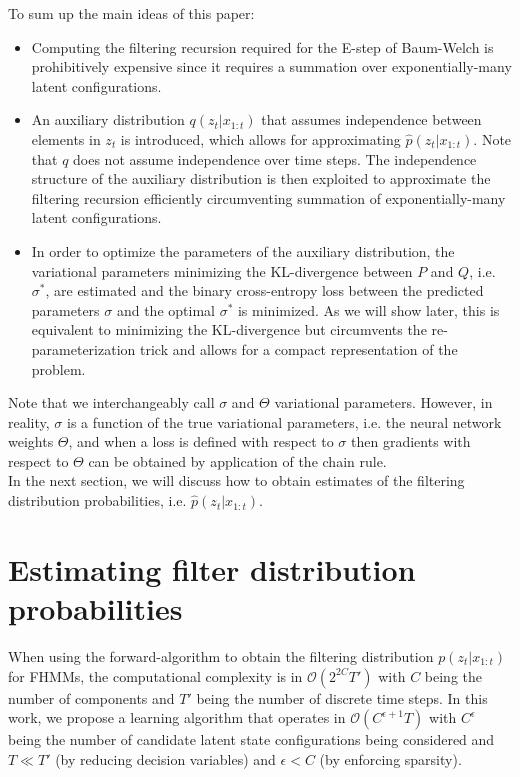 To sum up the main ideas of this paper:
\begin{itemize}
\item Computing the filtering recursion required for the E-step of Baum-Welch is prohibitively expensive since it requires a summation over exponentially-many latent configurations.
\item An auxiliary distribution $q(z_t|x_{1:t})$ that assumes independence between elements in $z_t$ is introduced, which allows for approximating $\hat{p}(z_t|x_{1:t})$. Note that $q$ does not assume independence over time steps. The independence structure of the auxiliary distribution is then exploited to approximate the filtering recursion efficiently circumventing summation of exponentially-many latent configurations.
\item In order to optimize the parameters of the auxiliary distribution, the variational parameters minimizing the KL-divergence between $P$ and $Q$, i.e. $\sigma^*$, are estimated and the binary cross-entropy loss between the predicted parameters $\sigma$ and the optimal $\sigma^*$ is minimized. As we will show later, this is equivalent to minimizing the KL-divergence but circumvents the re-parameterization trick and allows for a compact representation of the problem.
\end{itemize}
Note that we interchangeably call $\sigma$ and $\Theta$ variational parameters. However, in reality, $\sigma$ is a function of the true variational parameters, i.e. the neural network weights $\Theta$, and when a loss is defined with respect to $\sigma$ then gradients with respect to $\Theta$ can be obtained by application of the chain rule.\\
In the next section, we will discuss how to obtain estimates of the filtering distribution probabilities, i.e. $\hat{p}(z_t|x_{1:t})$.

\section{Estimating filter distribution probabilities}
\label{sec:esti}
When using the forward-algorithm to obtain the filtering distribution $p(z_{t}|x_{1:t})$ for FHMMs, the computational complexity is in $\mathcal{O}(2^{2C}T')$ with $C$ being the number of components and $T'$ being the number of discrete time steps. In this work, we propose a learning algorithm that operates in $\mathcal{O}(C^{\epsilon+1}T)$ with $C^\epsilon$ being the number of candidate latent state configurations being considered and $T \ll T'$ (by reducing decision variables) and $\epsilon < C$ (by enforcing sparsity).
